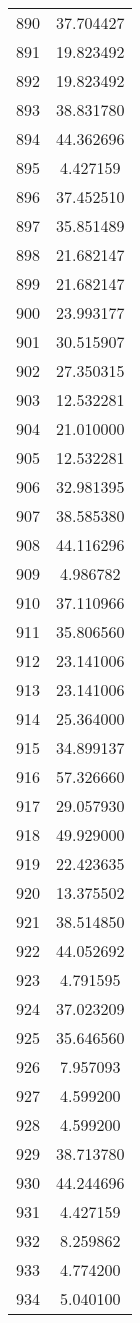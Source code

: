\documentclass[12pt]{article}
\begin{document}
\begin{longtable}{@{}cc@{}}
890 & 37.704427 \\
891 & 19.823492 \\
892 & 19.823492 \\
893 & 38.831780 \\
894 & 44.362696 \\
895 & 4.427159 \\
896 & 37.452510 \\
897 & 35.851489 \\
898 & 21.682147 \\
899 & 21.682147 \\
900 & 23.993177 \\
901 & 30.515907 \\
902 & 27.350315 \\
903 & 12.532281 \\
904 & 21.010000 \\
905 & 12.532281 \\
906 & 32.981395 \\
907 & 38.585380 \\
908 & 44.116296 \\
909 & 4.986782 \\
910 & 37.110966 \\
911 & 35.806560 \\
912 & 23.141006 \\
913 & 23.141006 \\
914 & 25.364000 \\
915 & 34.899137 \\
916 & 57.326660 \\
917 & 29.057930 \\
918 & 49.929000 \\
919 & 22.423635 \\
920 & 13.375502 \\
921 & 38.514850 \\
922 & 44.052692 \\
923 & 4.791595 \\
924 & 37.023209 \\
925 & 35.646560 \\
926 & 7.957093 \\
927 & 4.599200 \\
928 & 4.599200 \\
929 & 38.713780 \\
930 & 44.244696 \\
931 & 4.427159 \\
932 & 8.259862 \\
933 & 4.774200 \\
934 & 5.040100 \\

\end{longtable}
\end{document}
